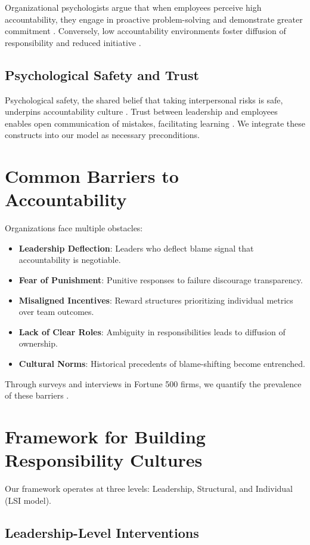 \documentclass[11pt,a4paper]{article}
\begin{document}
Organizational psychologists argue that when employees perceive high accountability, they engage in proactive problem-solving and demonstrate greater commitment \cite{Tosi2000}. Conversely, low accountability environments foster diffusion of responsibility and reduced initiative \cite{Latane1981}.

\subsection{Psychological Safety and Trust}
Psychological safety, the shared belief that taking interpersonal risks is safe, underpins accountability culture \cite{Edmondson1999}. Trust between leadership and employees enables open communication of mistakes, facilitating learning \cite{Mayer1995}. We integrate these constructs into our model as necessary preconditions.

\section{Common Barriers to Accountability}\label{sec:barriers}
Organizations face multiple obstacles:
\begin{itemize}[itemsep=0.5em]
  \item \textbf{Leadership Deflection}: Leaders who deflect blame signal that accountability is negotiable. 
  \item \textbf{Fear of Punishment}: Punitive responses to failure discourage transparency. 
  \item \textbf{Misaligned Incentives}: Reward structures prioritizing individual metrics over team outcomes. 
  \item \textbf{Lack of Clear Roles}: Ambiguity in responsibilities leads to diffusion of ownership. 
  \item \textbf{Cultural Norms}: Historical precedents of blame-shifting become entrenched. 
\end{itemize}

Through surveys and interviews in Fortune 500 firms, we quantify the prevalence of these barriers \cite{Smith2020}.

\section{Framework for Building Responsibility Cultures}\label{sec:framework}
Our framework operates at three levels: Leadership, Structural, and Individual (LSI model).

\subsection{Leadership-Level Interventions}
\end{document}
